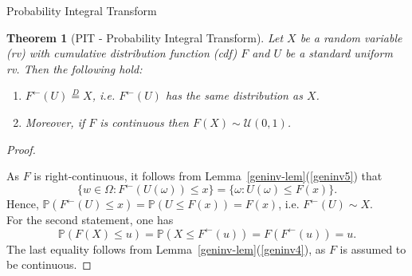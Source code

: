 \documentclass[envcountsect]{beamer}
\newcommand{\bR}{\mathbb{R}}
\newcommand{\bP}{\mathbb{P}}
\theoremstyle{definition}
\theoremstyle{plain}
\newtheorem{thm}[df]{Theorem}
\newcommand*{\geninv}[1]{#1^{\leftarrow}}
\newcommand*{\udist}{\mathcal{U}(0,1)}
\newcommand*{\eqdist}{\overset{D}{=}}
\begin{document}
\begin{frame}{Probability Integral Transform}
\begin{thm}[PIT - Probability Integral Transform]
\label{thm:pit}
Let $X$ be a random variable (rv) with cumulative distribution function (cdf) $F$ and $U$ be a standard uniform rv. Then the following hold:
	\begin{enumerate}
		\item $\geninv{F}(U) \eqdist X$, i.e. $\geninv{F}(U)$ has the same distribution as $X$.
		\item Moreover, if $F$ is continuous then $	F(X) \sim \udist$.
	\end{enumerate}
\end{thm}
\begin{proof}
	\begin{figure}
		\centering
	\end{figure}
	As $F$ is right-continuous, it follows from Lemma~\ref{geninv-lem}(\ref{geninv5}) that \[\{w\in \Omega: \geninv{F}(U(\omega)) \le x\} = \{\omega: U(\omega) \le F(x)\}.\] Hence, $\bP(\geninv{F}(U) \le x) = \bP(U\le F(x)) = F(x)$, i.e. $\geninv{F}(U)\sim X$.\\
	For the second statement, one has
	\[\bP(F(X) \le u) = \bP(X \le \geninv{F}(u)) = F(\geninv{F}(u)) = u.\] The last equality follows from Lemma~\ref{geninv-lem}(\ref{geninv4}), as $F$ is assumed to be continuous.
\end{proof}
\end{frame}
\end{document}
